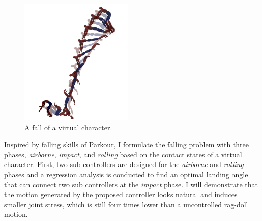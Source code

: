 \begin{figure}
 \vspace{-25pt}
  \begin{center}
    \includegraphics[width=0.48\textwidth]{images/intro_falling_sequence.png}
  \end{center}
   \vspace{-25pt}
  \caption{A fall of a virtual character.}
  \label{fig:intro_landing}
   \vspace{-10pt}
\end{figure}

Inspired by falling skills of Parkour, 
I formulate the falling problem
with three phases, \emph{airborne}, \emph{impact}, and \emph{rolling}
based on the contact states of a virtual character.
First, two sub-controllers are designed for the \emph{airborne} and
\emph{rolling} phases and a regression analysis is conducted to find 
an optimal landing angle that can connect two sub controllers at the
\emph{impact} phase.
I will demonstrate that the motion generated by the proposed controller
looks natural and induces smaller joint stress, which is still four times lower
than a uncontrolled rag-doll motion.


